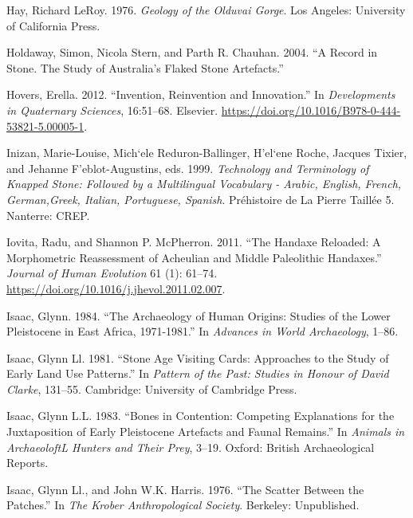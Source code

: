 \documentclass[]{elsarticle} %
\begin{document}
\leavevmode\hypertarget{ref-hayGeologyOlduvaiGorge1976}{}%
Hay, Richard LeRoy. 1976. \emph{Geology of the Olduvai Gorge}. Los
Angeles: University of California Press.

\leavevmode\hypertarget{ref-holdawayRecordStoneStudy2004}{}%
Holdaway, Simon, Nicola Stern, and Parth R. Chauhan. 2004. ``A Record in
Stone. The Study of Australia's Flaked Stone Artefacts.''

\leavevmode\hypertarget{ref-hoversInventionReinventionInnovation2012}{}%
Hovers, Erella. 2012. ``Invention, Reinvention and Innovation.'' In
\emph{Developments in Quaternary Sciences}, 16:51--68. Elsevier.
\url{https://doi.org/10.1016/B978-0-444-53821-5.00005-1}.

\leavevmode\hypertarget{ref-inizanTechnologyTerminologyKnapped1999}{}%
Inizan, Marie-Louise, Mich\a`ele Reduron-Ballinger, H\a'el\a`ene Roche,
Jacques Tixier, and Jehanne F\a'eblot-Augustins, eds. 1999.
\emph{Technology and Terminology of Knapped Stone: Followed by a
Multilingual Vocabulary - Arabic, English, French, German,Greek,
Italian, Portuguese, Spanish}. Préhistoire de La Pierre Taillée 5.
Nanterre: CREP.

\leavevmode\hypertarget{ref-iovitaHandaxeReloadedMorphometric2011}{}%
Iovita, Radu, and Shannon P. McPherron. 2011. ``The Handaxe Reloaded: A
Morphometric Reassessment of Acheulian and Middle Paleolithic
Handaxes.'' \emph{Journal of Human Evolution} 61 (1): 61--74.
\url{https://doi.org/10.1016/j.jhevol.2011.02.007}.

\leavevmode\hypertarget{ref-isaacArchaeologyHumanOrigins1984}{}%
Isaac, Glynn. 1984. ``The Archaeology of Human Origins: Studies of the
Lower Pleistocene in East Africa, 1971-1981.'' In \emph{Advances in
World Archaeology}, 1--86.

\leavevmode\hypertarget{ref-isaacStoneAgeVisiting1981}{}%
Isaac, Glynn Ll. 1981. ``Stone Age Visiting Cards: Approaches to the
Study of Early Land Use Patterns.'' In \emph{Pattern of the Past:
Studies in Honour of David Clarke}, 131--55. Cambridge: University of
Cambridge Press.

\leavevmode\hypertarget{ref-isaacBonesContentionCompeting1983}{}%
Isaac, Glynn L.L. 1983. ``Bones in Contention: Competing Explanations
for the Juxtaposition of Early Pleistocene Artefacts and Faunal
Remains.'' In \emph{Animals in ArchaeoloftL Hunters and Their Prey},
3--19. Oxford: British Archaeological Reports.

\leavevmode\hypertarget{ref-isaacScatterPatches1976}{}%
Isaac, Glynn Ll., and John W.K. Harris. 1976. ``The Scatter Between the
Patches.'' In \emph{The Krober Anthropological Society}. Berkeley:
Unpublished.
\end{document}
